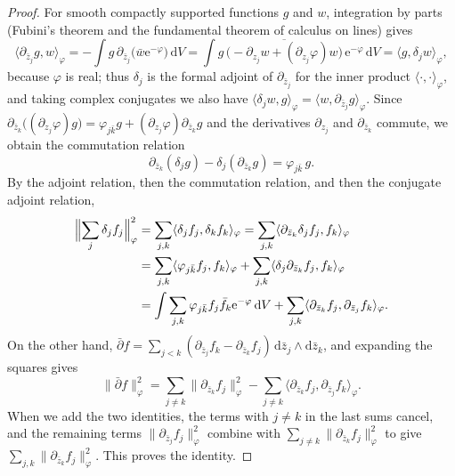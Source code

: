 \begin{proof}
For smooth compactly supported functions $g$ and $w$, integration by parts (Fubini's theorem and the fundamental theorem of calculus on lines) gives
\[
 \langle\partial_{\bar z_j}g,w\rangle_\varphi=-\int g\,\partial_{\bar z_j}\bigl(\bar w\mathrm e^{-\varphi}\bigr)\,\mathrm dV=\int g\,\overline{\bigl(-\partial_{z_j}w+(\partial_{z_j}\varphi)w\bigr)}\,\mathrm e^{-\varphi}\,\mathrm dV=\langle g,\delta_jw\rangle_\varphi,
\]
because $\varphi$ is real; thus $\delta_j$ is the formal adjoint of $\partial_{\bar z_j}$ for the inner product $\langle\cdot,\cdot\rangle_\varphi$, and taking complex conjugates we also have $\langle\delta_jw,g\rangle_\varphi=\langle w,\partial_{\bar z_j}g\rangle_\varphi$. Since $\partial_{\bar z_k}\bigl((\partial_{z_j}\varphi)g\bigr)=\varphi_{j\bar k}g+(\partial_{z_j}\varphi)\partial_{\bar z_k}g$ and the derivatives $\partial_{z_j}$ and $\partial_{\bar z_k}$ commute, we obtain the commutation relation
\[
 \partial_{\bar z_k}(\delta_jg)-\delta_j(\partial_{\bar z_k}g)=\varphi_{j\bar k}\,g.
\]
By the adjoint relation, then the commutation relation, and then the conjugate adjoint relation,
\[
 \begin{split}
 \Bigl\|\sum_j\delta_jf_j\Bigr\|_\varphi^2&=\sum_{j,k}\langle\delta_jf_j,\delta_kf_k\rangle_\varphi=\sum_{j,k}\langle\partial_{\bar z_k}\delta_jf_j,f_k\rangle_\varphi\\
 &=\sum_{j,k}\langle\varphi_{j\bar k}f_j,f_k\rangle_\varphi+\sum_{j,k}\langle\delta_j\partial_{\bar z_k}f_j,f_k\rangle_\varphi\\
 &=\int\sum_{j,k}\varphi_{j\bar k}f_j\bar f_k\mathrm e^{-\varphi}\,\mathrm dV+\sum_{j,k}\langle\partial_{\bar z_k}f_j,\partial_{\bar z_j}f_k\rangle_\varphi.
 \end{split}
\]
On the other hand, $\bar\partial f=\sum_{j<k}(\partial_{\bar z_j}f_k-\partial_{\bar z_k}f_j)\,\mathrm d\bar z_j\wedge\mathrm d\bar z_k$, and expanding the squares gives
\[
 \|\bar\partial f\|_\varphi^2=\sum_{j\ne k}\|\partial_{\bar z_k}f_j\|_\varphi^2-\sum_{j\ne k}\langle\partial_{\bar z_k}f_j,\partial_{\bar z_j}f_k\rangle_\varphi.
\]
When we add the two identities, the terms with $j\ne k$ in the last sums cancel, and the remaining terms $\|\partial_{\bar z_j}f_j\|_\varphi^2$ combine with $\sum_{j\ne k}\|\partial_{\bar z_k}f_j\|_\varphi^2$ to give $\sum_{j,k}\|\partial_{\bar z_k}f_j\|_\varphi^2$. This proves the identity.


\end{proof}
